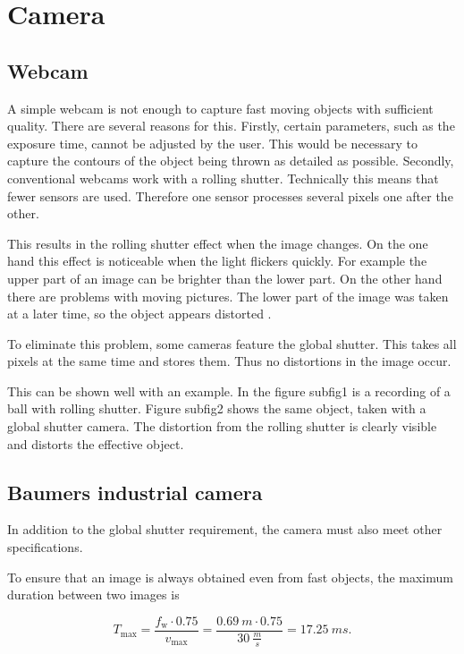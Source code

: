 \section{Camera}
\label{sec:camera}
\subsection{Webcam}
\label{subsec:webcam}
A simple webcam is not enough to capture fast moving objects with sufficient quality. 
There are several reasons for this.
Firstly, certain parameters, such as the exposure time, cannot be adjusted by the user.
This would be necessary to capture the contours of the object being thrown as detailed as possible.
Secondly, conventional webcams work with a rolling shutter.
Technically this means that fewer sensors are used. Therefore one sensor processes several pixels one after the other.

This results in the rolling shutter effect when the image changes.
On the one hand this effect is noticeable when the light flickers quickly.
For example the upper part of an image can be brighter than the lower part.
On the other hand there are problems with moving pictures.
The lower part of the image was taken at a later time, so the object appears distorted \cite{GlobalRollingShutter}.

To eliminate this problem, some cameras feature the global shutter. 
This takes all pixels at the same time and stores them. 
Thus no distortions in the image occur.

This can be shown well with an example.
In the figure subfig1 is a recording of a ball with rolling shutter. 
Figure subfig2 shows the same object, taken with a global shutter camera.
The distortion from the rolling shutter is clearly visible and distorts the effective object.


\subsection{Baumers industrial camera}
\label{subsec:baumer_cam}

In addition to the global shutter requirement, the camera must also meet other specifications.

To ensure that an image is always obtained even from fast objects, the maximum duration between two images is

\begin{equation}
  T_\text{max} = \frac{f_\text{w} \cdot 0.75}{v_\text{max}} = \frac{\SI{0.69}{m} \cdot 0.75}{\SI{30}{\frac{m}{s}}} = \SI{17.25}{ms}.
  \label{eq:needed_T}
\end{equation}

